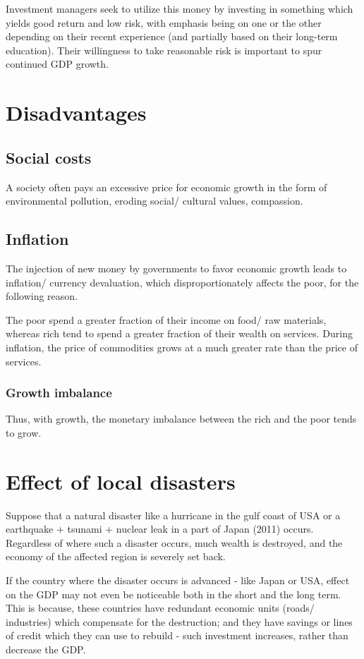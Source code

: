 \documentclass[oneside, article]{memoir}
\begin{document}
Investment managers seek to utilize this money by investing in something which yields good return and low risk, with emphasis being on one or the other depending on their recent experience (and partially based on their long-term education). Their willingness to take reasonable risk is important to spur continued GDP growth.

\section{Disadvantages}
\subsection{Social costs}
A society often pays an excessive price for economic growth in the form of environmental pollution, eroding social/ cultural values, compassion.

\subsection{Inflation}
The injection of new money by governments to favor economic growth leads to inflation/ currency devaluation, which disproportionately affects the poor, for the following reason.

The poor spend a greater fraction of their income on food/ raw materials, whereas rich tend to spend a greater fraction of their wealth on services. During inflation, the price of commodities grows at a much greater rate than the price of services.

\subsubsection{Growth imbalance}
Thus, with growth, the monetary imbalance between the rich and the poor tends to grow.

\section{Effect of local disasters}
Suppose that a natural disaster like a hurricane in the gulf coast of USA or a earthquake + tsunami + nuclear leak in a part of Japan (2011) occurs. Regardless of where such a disaster occurs, much wealth is destroyed, and the economy of the affected region is severely set back.

If the country where the disaster occurs is advanced - like Japan or USA, effect on the GDP may not even be noticeable both in the short and the long term. This is because, these countries have redundant economic units (roads/ industries) which compensate for the destruction; and they have savings or lines of credit which they can use to rebuild - such investment increases, rather than decrease the GDP.
\end{document}
